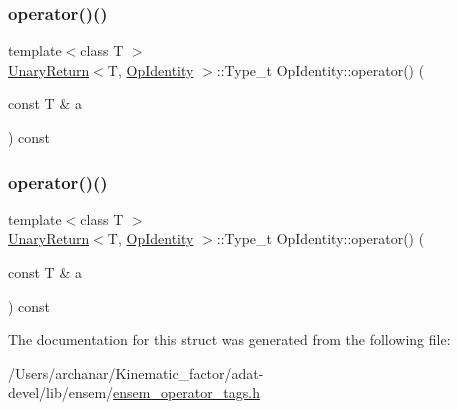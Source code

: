 \mbox{\label{structOpIdentity_a1d482adc4d4bd1a7fee1616bb11c1f71}} 
\subsubsection{\texorpdfstring{operator()()}{operator()()}\hspace{0.1cm}{\footnotesize\ttfamily [2/3]}}
{\footnotesize\ttfamily template$<$class T $>$ \\
\mbox{\hyperlink{structUnaryReturn}{Unary\+Return}}$<$T, \mbox{\hyperlink{structOpIdentity}{Op\+Identity}} $>$\+::Type\+\_\+t Op\+Identity\+::operator() (\begin{DoxyParamCaption}\item[{const T \&}]{a }\end{DoxyParamCaption}) const\hspace{0.3cm}{\ttfamily [inline]}}

\mbox{\label{structOpIdentity_a1d482adc4d4bd1a7fee1616bb11c1f71}} 
\subsubsection{\texorpdfstring{operator()()}{operator()()}\hspace{0.1cm}{\footnotesize\ttfamily [3/3]}}
{\footnotesize\ttfamily template$<$class T $>$ \\
\mbox{\hyperlink{structUnaryReturn}{Unary\+Return}}$<$T, \mbox{\hyperlink{structOpIdentity}{Op\+Identity}} $>$\+::Type\+\_\+t Op\+Identity\+::operator() (\begin{DoxyParamCaption}\item[{const T \&}]{a }\end{DoxyParamCaption}) const\hspace{0.3cm}{\ttfamily [inline]}}



The documentation for this struct was generated from the following file\+:\begin{DoxyCompactItemize}
\item 
/\+Users/archanar/\+Kinematic\+\_\+factor/adat-\/devel/lib/ensem/\mbox{\hyperlink{adat-devel_2lib_2ensem_2ensem__operator__tags_8h}{ensem\+\_\+operator\+\_\+tags.\+h}}\end{DoxyCompactItemize}
